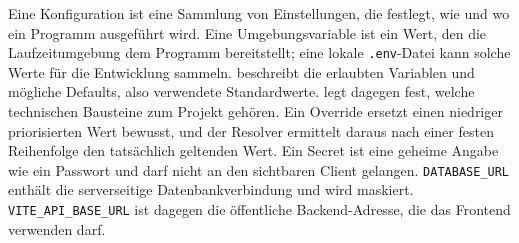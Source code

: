 \begin{beginnerstatement}

Eine Konfiguration ist eine Sammlung von Einstellungen, die festlegt, wie und
wo ein Programm ausgeführt wird. Eine Umgebungsvariable ist ein Wert, den die
Laufzeitumgebung dem Programm bereitstellt; eine lokale \texttt{.env}-Datei
kann solche Werte für die Entwicklung sammeln. 
beschreibt die erlaubten Variablen und mögliche Defaults, also verwendete
Standardwerte.  legt dagegen fest, welche
technischen Bausteine zum Projekt gehören. Ein Override ersetzt einen
niedriger priorisierten Wert bewusst, und der Resolver ermittelt daraus nach
einer festen Reihenfolge den tatsächlich geltenden Wert. Ein Secret ist eine
geheime Angabe wie ein Passwort und darf nicht an den sichtbaren Client
gelangen. \texttt{DATABASE\_URL} enthält die serverseitige
Datenbankverbindung und wird maskiert. \texttt{VITE\_API\_BASE\_URL} ist
dagegen die öffentliche Backend-Adresse, die das Frontend verwenden darf.

\end{beginnerstatement}
